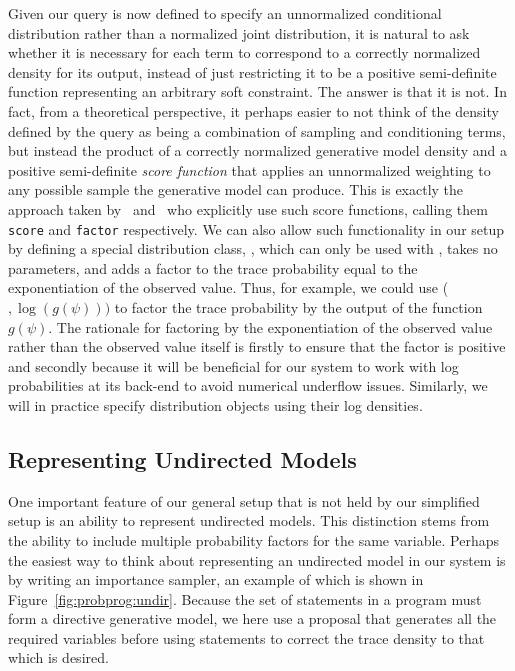 Given our query is now defined to specify an unnormalized conditional distribution rather than a normalized
joint distribution, it is natural to ask whether it is necessary for each \observe term to correspond to
a correctly normalized density for its output, instead of just restricting it to be a positive semi-definite
function representing an arbitrary soft constraint.  The answer is that it is not.  In fact, from a theoretical perspective,
it perhaps easier to not think of the density defined by the query as being a combination of sampling and conditioning terms,
but instead the product of a correctly normalized generative
model density and a positive semi-definite \emph{score function} that applies an unnormalized weighting to any possible
sample the generative model can produce.  This is
exactly the approach taken by~\citep{staton2016semantics} and~\citep{goodman_book_2014} who explicitly use such
score functions, calling them {\small \texttt{score}} and {\small \texttt{factor}} respectively.
We can also allow such functionality in our setup by defining a
special distribution class, \boppfactor, which can only be used with \observe, takes no parameters, and 
adds a factor to the trace probability equal to the exponentiation of the observed value.  Thus, for example, we could use
\observe (\boppfactor$,\log(g(\psi)))$ to factor the trace probability by the output of the function $g(\psi)$.
The rationale for factoring by the exponentiation of the observed value rather than the observed value itself
is firstly to ensure that the factor is positive and secondly because it will be beneficial for
our system to work with log probabilities at its back-end to avoid numerical underflow issues.  Similarly,
we will in practice specify distribution objects using their log densities.

\subsection{Representing Undirected Models}
\label{sec:probprog:models:undirected}

One important feature of our general setup that is not held by our simplified setup
is an ability to represent undirected models.  This distinction stems from the
ability to include multiple probability factors for the same variable.  Perhaps the easiest way to think
about representing an undirected model in our system is by writing an importance sampler, an example of which
is shown in Figure~\ref{fig:probprog:undir}.   Because the set of \sample statements in a program must
form a directive generative model, we here use a proposal that generates all the required variables before
using \observe statements to correct the trace density to that which is desired.

